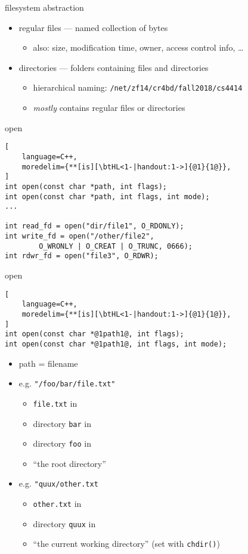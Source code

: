\begin{frame}{filesystem abstraction}
\begin{itemize}
\item regular files --- named collection of bytes
    \begin{itemize}
    \item also: size, modification time, owner, access control info, \ldots
    \end{itemize}
\item directories --- folders containing files and directories
    \begin{itemize}
    \item hierarchical naming: \texttt{/net/zf14/cr4bd/fall2018/cs4414}
    \item \textit{mostly} contains regular files or directories
    \end{itemize}
\end{itemize}
\end{frame}

\begin{frame}[fragile,label=openExample]{open}
\begin{lstlisting}[
    language=C++,
    moredelim={**[is][\btHL<1-|handout:1->]{@1}{1@}},
]
int open(const char *path, int flags);
int open(const char *path, int flags, int mode);
...

int read_fd = open("dir/file1", O_RDONLY);
int write_fd = open("/other/file2",
        O_WRONLY | O_CREAT | O_TRUNC, 0666);
int rdwr_fd = open("file3", O_RDWR);
\end{lstlisting}
\end{frame}

\begin{frame}[fragile,label=openExplainPath]{open}
\begin{lstlisting}[
    language=C++,
    moredelim={**[is][\btHL<1-|handout:1->]{@1}{1@}},
]
int open(const char *@1path1@, int flags);
int open(const char *@1path1@, int flags, int mode);
\end{lstlisting}
\begin{itemize}
\item path = filename
\item e.g. \texttt{"/foo/bar/file.txt"}
    \begin{itemize}
    \item \texttt{file.txt} in 
    \item directory \texttt{bar} in
    \item directory \texttt{foo} in 
    \item ``the root directory''
    \end{itemize}
\item e.g. \texttt{"quux/other.txt}
    \begin{itemize}
    \item \texttt{other.txt} in 
    \item directory \texttt{quux} in
    \item ``the current working directory'' (set with \texttt{chdir()})
    \end{itemize}
\end{itemize}
\end{frame}

